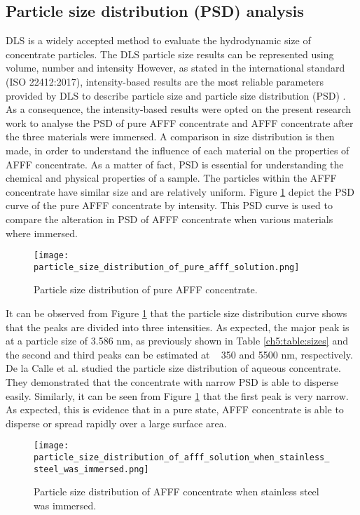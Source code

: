 \subsection{Particle size distribution (PSD) analysis} 
DLS is a widely accepted method to evaluate the hydrodynamic size of concentrate particles. The DLS particle size results can be represented using volume, number and intensity However, as stated in the international standard (ISO 22412:2017), intensity-based results are the most reliable parameters provided by DLS to describe particle size and particle size distribution (PSD) \cite{bellamy1980infrared}. As a consequence, the intensity-based results were opted on the present research work to analyse the PSD of pure AFFF concentrate and AFFF concentrate after the three materials were immersed. A comparison in size distribution is then made, in order to understand the influence of each material on the properties of AFFF concentrate. As a matter of fact, PSD is essential for understanding the chemical and physical properties of a sample. The particles within the AFFF concentrate have similar size and are relatively uniform. Figure \ref{ch5:figure:pure_afff} depict the PSD curve of the pure AFFF concentrate by intensity. This PSD curve is used to compare the alteration in PSD of AFFF concentrate when various materials where immersed. 

\begin{figure}[H]
    \centering
    \texttt{[image: particle\_size\_distribution\_of\_pure\_afff\_solution.png]}
    \caption{Particle size distribution of pure AFFF concentrate.}
    \label{ch5:figure:pure_afff}
\end{figure}

 It can be observed from Figure \ref{ch5:figure:pure_afff} that the particle size distribution curve shows that the peaks are divided into three intensities. As expected, the major peak is at a particle size of 3.586 nm, as previously shown in Table \ref{ch5:table:sizes} and the second and third peaks can be estimated at ~ 350 and 5500 nm, respectively. De la Calle et al. \cite{mudunkotuwa2014atr} studied the particle size distribution of aqueous concentrate. They demonstrated that the concentrate with narrow PSD is able to disperse easily. Similarly, it can be seen from Figure \ref{ch5:figure:pure_afff} that the first peak is very narrow. As expected, this is evidence that in a pure state, AFFF concentrate is able to disperse or spread rapidly over a large surface area.

\begin{figure}[H]
    \centering
    \texttt{[image: particle\_size\_distribution\_of\_afff\_solution\_when\_stainless\_steel\_was\_immersed.png]}
    \caption{Particle size distribution of AFFF concentrate when stainless steel was immersed.}
    \label{ch5:figure:stainless_steel}
\end{figure}

